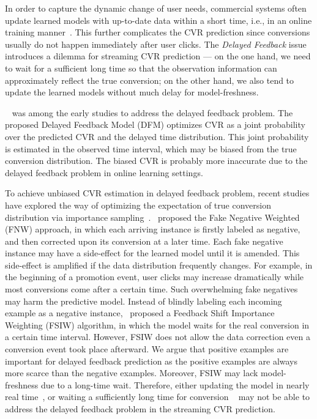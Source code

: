 \documentclass[letterpaper]{article}
\begin{document}
In order to capture the dynamic change of user needs, commercial systems often update learned models with up-to-date data within a short time, i.e., in an online training manner~\cite{jugovac2018streamingrec,guo2019streaming,FNW}. This further complicates the CVR prediction since conversions usually do not happen immediately after user clicks. The \textit{Delayed Feedback} issue introduces a dilemma for streaming CVR prediction --- on the one hand, we need to wait for a sufficient long time so that the observation information can approximately reflect the true conversion; on the other hand, we also tend to update the learned models without much delay for model-freshness.

~\citet{DFM} was among the early studies to address the delayed feedback problem. The proposed Delayed Feedback Model (DFM) optimizes CVR as a joint probability over the predicted CVR and the delayed time distribution. This joint probability is estimated in the observed time interval, which may be biased from the true conversion distribution. The biased CVR is probably more inaccurate due to the delayed feedback problem in online learning settings.

To achieve unbiased CVR estimation in delayed feedback problem, recent studies have explored the way of optimizing the expectation of true conversion distribution via importance sampling~\cite{importance_weight}.~\citet{FNW} proposed the Fake Negative Weighted (FNW) approach, in which each arriving instance is firstly labeled as negative, and then corrected upon its conversion at a later time. Each fake negative instance may have a side-effect for the learned model until it is amended. This side-effect is amplified if the data distribution frequently changes. For example, in the beginning of a promotion event, user clicks may increase dramatically while most conversions come after a certain time. Such overwhelming fake negatives may harm the predictive model. Instead of blindly labeling each incoming example as a negative instance,~\citet{FSIW} proposed a Feedback Shift Importance Weighting (FSIW) algorithm, in which the model waits for the real conversion in a certain time interval. However, FSIW does not allow the data correction even a conversion event took place afterward. We argue that positive examples are important for delayed feedback prediction as the positive examples are always more scarce than the negative examples. Moreover, FSIW may lack model-freshness due to a long-time wait. Therefore, either updating the model in nearly real time~\cite{FNW}, or waiting a sufficiently long time for conversion ~\cite{FSIW} may not be able to address the delayed feedback problem in the streaming CVR prediction.
\end{document}
